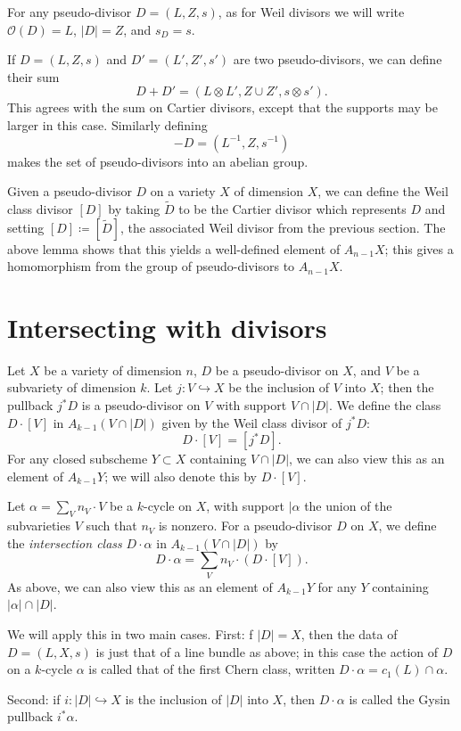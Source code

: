 \documentclass[leqno, openany]{memoir}
\theoremstyle{definition}
\theoremstyle{remark}
\theoremstyle{plain}
\theoremstyle{definition}
\theoremstyle{remark}
\newcommand{\mc}[1]{\mathcal{#1}}
\begin{document}
For any pseudo-divisor $D = (L,Z,s)$, as for Weil divisors we will write
$\mc{O}(D) = L$, $|D| = Z$, and $s_D = s$.

If $D = (L,Z,s)$ and $D' = (L', Z', s')$ are two pseudo-divisors, we can define
their sum \[ D + D' = (L \otimes L', Z \cup Z', s \otimes s') . \] This agrees
with the sum on Cartier divisors, except that the supports may be larger in
this case. Similarly defining \[ -D = (L^{-1}, Z, s^{-1}) \] makes the set of
pseudo-divisors into an abelian group.

Given a pseudo-divisor $D$ on a variety $X$ of dimension $X$, we can define the
Weil class divisor $[D]$ by taking $\tilde D$ to be the Cartier divisor which
represents $D$ and setting $[D] \coloneqq [\tilde D]$, the associated Weil
divisor from the previous section. The above lemma shows that this yields a
well-defined element of $A_{n-1} X$; this gives a homomorphism from the group
of pseudo-divisors to $A_{n-1} X$.

\section{Intersecting with divisors} Let $X$ be a variety of dimension $n$, $D$
be a pseudo-divisor on $X$, and $V$ be a subvariety of dimension $k$. Let
$j\colon V \hookrightarrow X$ be the inclusion of $V$ into $X$; then the
pullback $j^* D$ is a pseudo-divisor on $V$ with support $V \cap |D|$. We
define the class $D \cdot [V]$ in $A_{k-1} (V \cap |D|)$ given by the Weil
class divisor of $j^* D$: \[ D \cdot [V] = [j^* D] . \] For any closed
subscheme $Y \subset X$ containing $V \cap |D|$, we can also view this as an
element of $A_{k-1} Y$; we will also denote this by $D \cdot [V]$.

Let $\alpha = \sum_V n_V \cdot V$ be a $k$-cycle on $X$, with support $|\alpha$
the union of the subvarieties $V$ such that $n_V$ is nonzero. For a
pseudo-divisor $D$ on $X$, we define the \textit{intersection class} $D \cdot
\alpha$ in $A_{k-1}(V \cap |D|)$ by \[ D \cdot \alpha = \sum_V n_V \cdot (D
\cdot [V]) . \] As above, we can also view this as an element of $A_{k-1} Y$
for any $Y$ containing $|\alpha| \cap |D|$.

We will apply this in two main cases. First: f $|D| = X$, then the data of $D =
(L, X, s)$ is just that of a line bundle as above; in this case the action of
$D$ on a $k$-cycle $\alpha$ is called that of the first Chern class, written $D
\cdot \alpha = c_1(L) \cap \alpha$.

Second: if $i\colon |D| \hookrightarrow X$ is the inclusion of $|D|$ into $X$,
then $D \cdot \alpha$ is called the Gysin pullback $i^* \alpha$.
\end{document}
